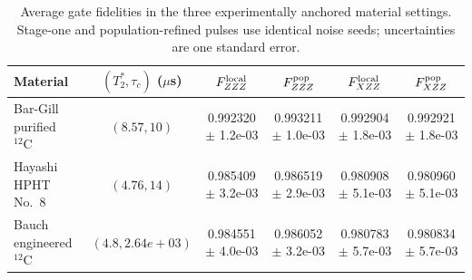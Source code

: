 \begin{table}[t]
\centering
\caption{Average gate fidelities in the three experimentally anchored material settings. Stage-one and population-refined pulses use identical noise seeds; uncertainties are one standard error.}
\label{tab:experimental_material_results}
\small
\begin{tabular}{lccccc}
\toprule
Material & $(T_2^*,\tau_c)$ ($\mu$s) & $F_{ZZZ}^{\rm local}$ & $F_{ZZZ}^{\rm pop}$ & $F_{XZZ}^{\rm local}$ & $F_{XZZ}^{\rm pop}$ \\
\midrule
Bar-Gill purified $^{12}\mathrm C$ & $(8.57,10)$ & 0.992320 $\pm$ 1.2e-03 & 0.993211 $\pm$ 1.0e-03 & 0.992904 $\pm$ 1.8e-03 & 0.992921 $\pm$ 1.8e-03 \\
Hayashi HPHT No.~8 & $(4.76,14)$ & 0.985409 $\pm$ 3.2e-03 & 0.986519 $\pm$ 2.9e-03 & 0.980908 $\pm$ 5.1e-03 & 0.980960 $\pm$ 5.1e-03 \\
Bauch engineered $^{12}\mathrm C$ & $(4.8,2.64e+03)$ & 0.984551 $\pm$ 4.0e-03 & 0.986052 $\pm$ 3.2e-03 & 0.980783 $\pm$ 5.7e-03 & 0.980834 $\pm$ 5.7e-03 \\
\bottomrule
\end{tabular}
\end{table}
